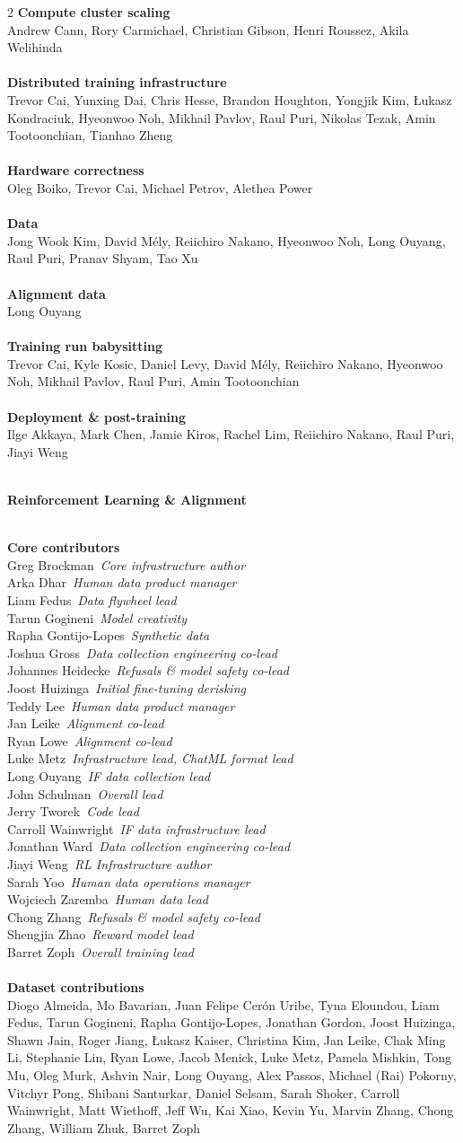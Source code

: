 \documentclass{article}
\newcommand{\creditsectionheader}[1]{\parbox{\columnwidth}{\centering \textbf{\small #1}}\\}
\newcommand{\creditlistheader}[1]{\textbf{#1}\footnotemark[\thefootnote]\\}
\newcommand{\creditlist}[2]{\creditlistheader{#1}#2\\
\\}
\newcommand{\corecontributor}[2]{#1\ \textit{#2}\\}
\begin{document}
\begin{multicols}{2}
\creditlist{Compute cluster scaling}{Andrew Cann, Rory Carmichael, Christian Gibson, Henri Roussez, Akila Welihinda}
\creditlist{Distributed training infrastructure}{Trevor Cai, Yunxing Dai, Chris Hesse, Brandon Houghton, Yongjik Kim, \L{}ukasz Kondraciuk, Hyeonwoo Noh, Mikhail Pavlov, Raul Puri, Nikolas Tezak, Amin Tootoonchian, Tianhao Zheng}
\creditlist{Hardware correctness}{Oleg Boiko, Trevor Cai, Michael Petrov, Alethea Power}
\creditlist{Data}{Jong Wook Kim, David M\'ely, Reiichiro Nakano, Hyeonwoo Noh, Long Ouyang, Raul Puri, Pranav Shyam, Tao Xu}
\creditlist{Alignment data}{Long Ouyang}
\creditlist{Training run babysitting}{Trevor Cai, Kyle Kosic, Daniel Levy, David M\'ely, Reiichiro Nakano, Hyeonwoo Noh, Mikhail Pavlov, Raul Puri, Amin Tootoonchian}
\creditlist{Deployment \& post-training}{Ilge Akkaya, Mark Chen, Jamie Kiros, Rachel Lim, Reiichiro Nakano, Raul Puri, Jiayi Weng}
\creditsectionheader{Reinforcement Learning \& Alignment}
\creditlistheader{Core contributors}
\corecontributor{Greg Brockman}{Core infrastructure author}
\corecontributor{Arka Dhar}{Human data product manager}
\corecontributor{Liam Fedus}{Data flywheel lead}
\corecontributor{Tarun Gogineni}{Model creativity}
\corecontributor{Rapha Gontijo-Lopes}{Synthetic data}
\corecontributor{Joshua Gross}{Data collection engineering co-lead}
\corecontributor{Johannes Heidecke}{Refusals \& model safety co-lead}
\corecontributor{Joost Huizinga}{Initial fine-tuning derisking}
\corecontributor{Teddy Lee}{Human data product manager}
\corecontributor{Jan Leike}{Alignment co-lead}
\corecontributor{Ryan Lowe}{Alignment co-lead}
\corecontributor{Luke Metz}{Infrastructure lead, ChatML format lead}
\corecontributor{Long Ouyang}{IF data collection lead}
\corecontributor{John Schulman}{Overall lead}
\corecontributor{Jerry Tworek}{Code lead}
\corecontributor{Carroll Wainwright}{IF data infrastructure lead}
\corecontributor{Jonathan Ward}{Data collection engineering co-lead}
\corecontributor{Jiayi Weng}{RL Infrastructure author}
\corecontributor{Sarah Yoo}{Human data operations manager}
\corecontributor{Wojciech Zaremba}{Human data lead}
\corecontributor{Chong Zhang}{Refusals \& model safety co-lead}
\corecontributor{Shengjia Zhao}{Reward model lead}
\corecontributor{Barret Zoph}{Overall training lead}
\\
\creditlist{Dataset contributions}{Diogo Almeida, Mo Bavarian, Juan Felipe Cer\'on Uribe, Tyna Eloundou, Liam Fedus, Tarun Gogineni, Rapha Gontijo-Lopes, Jonathan Gordon, Joost Huizinga, Shawn Jain, Roger Jiang, \L{}ukasz Kaiser, Christina Kim, Jan Leike, Chak Ming Li, Stephanie Lin, Ryan Lowe, Jacob Menick, Luke Metz, Pamela Mishkin, Tong Mu, Oleg Murk, Ashvin Nair, Long Ouyang, Alex Passos, Michael (Rai) Pokorny, Vitchyr Pong, Shibani Santurkar, Daniel Selsam, Sarah Shoker, Carroll Wainwright, Matt Wiethoff, Jeff Wu, Kai Xiao, Kevin Yu, Marvin Zhang, Chong Zhang, William Zhuk, Barret Zoph}

\end{multicols}
\end{document}

